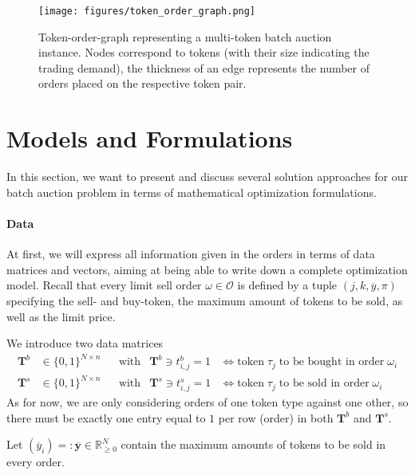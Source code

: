 \documentclass[11pt,parskip=full]{scrartcl}%
\newcommand*{\orders}{\mathcal{O}}          %
\begin{document}
\begin{figure}[t]
  \centering
  \texttt{[image: figures/token\_order\_graph.png]}
  \caption{Token-order-graph representing a multi-token batch auction instance. Nodes correspond
  to tokens (with their size indicating the trading demand), the thickness of an edge represents 
  the number of orders placed on the respective token pair.}
  \label{fig:order-token-graph}
\end{figure}


\clearpage
\section{Models and Formulations}
\label{sec:models}

In this section, we want to present and discuss several solution approaches for our batch auction
problem in terms of mathematical optimization formulations.

\vspace{-.2cm}
\paragraph{Data}

At first, we will express all information given in the orders in terms of data matrices and
vectors, aiming at being able to write down a complete optimization model.
Recall that every limit sell order $ \omega \in \orders $ is defined by a tuple
$ (j,k,\overline{y},\pi) $ specifying the sell- and buy-token, the maximum amount of
tokens to be sold, as well as the limit price.

We introduce two data matrices
\begin{align*}
  \mathbf{T}^b &\in \{0,1\}^{N \times n} && \text{with} & \mathbf{T}^b \ni t^b_{i,j} = 1
  &\Leftrightarrow
  \text{token} \; \tau_j \; \text{to be bought in order} \; \omega_i \\
  \mathbf{T}^s &\in \{0,1\}^{N \times n} && \text{with} & \mathbf{T}^s \ni t^s_{i,j} = 1
  &\Leftrightarrow
  \text{token} \; \tau_j \; \text{to be sold in order} \; \omega_i
\end{align*}
As for now, we are only considering orders of one token type against one other, so there must be
exactly one entry equal to $ 1 $ per row (order) in both $ \mathbf{T}^b $ and $ \mathbf{T}^s $.

Let $ (\overline{y}_i) =: \overline{\mathbf{y}} \in \mathbb{R}^N_{\ge 0} $
contain the maximum amounts of tokens to be sold in every order.
\end{document}
